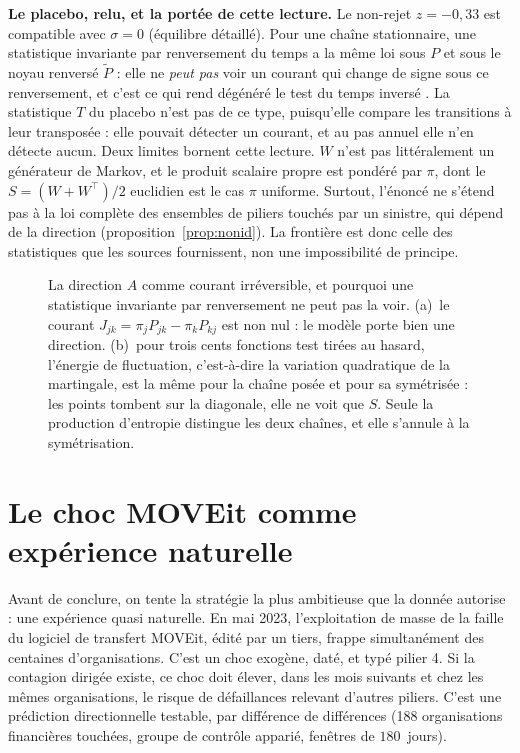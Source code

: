 \begin{cle}
\textbf{Le placebo, relu, et la portée de cette lecture.} Le non-rejet $z=-0{,}33$ est
compatible avec $\sigma=0$ (équilibre détaillé). Pour une chaîne stationnaire, une statistique
invariante par renversement du temps a la même loi sous $P$ et sous le noyau renversé $\tilde P$ :
elle ne \emph{peut pas} voir un courant qui change de signe sous ce renversement, et c'est ce qui
rend dégénéré le test du \og temps inversé \fg{}. La statistique $T$ du placebo n'est pas de ce
type, puisqu'elle compare les transitions à leur transposée : elle pouvait détecter un courant, et
au pas annuel elle n'en détecte aucun. Deux limites bornent cette lecture. $W$ n'est pas
littéralement un générateur de Markov, et le produit scalaire propre est pondéré par $\pi$, dont le
$S=(W+W^\top)/2$ euclidien est le cas $\pi$ uniforme. Surtout, l'énoncé ne s'étend pas à la loi
complète des ensembles de piliers touchés par un sinistre, qui dépend de la direction
(proposition~\ref{prop:nonid}). La frontière est donc celle des statistiques que les sources
fournissent, non une impossibilité de principe.
\end{cle}

\begin{figure}[htbp]
  \centering
  \caption{La direction $A$ comme courant irréversible, et
pourquoi une statistique invariante par renversement ne peut pas la voir. (a)~le courant $J_{jk}=\pi_jP_{jk}-\pi_kP_{kj}$
est non nul : le modèle porte bien une direction. (b)~pour trois cents fonctions test tirées au
hasard, l'énergie de fluctuation, c'est-à-dire la variation quadratique de la martingale, est la
même pour la chaîne posée et pour sa symétrisée : les points tombent sur la diagonale, elle ne voit
que $S$. Seule la production d'entropie distingue les deux chaînes, et elle s'annule à la
symétrisation.}
  \label{fig:reversibilite}
\end{figure}

\section{Le choc MOVEit comme expérience naturelle}

Avant de conclure, on tente la stratégie la plus ambitieuse que la donnée autorise : une
expérience quasi naturelle. En mai 2023, l'exploitation de masse de la faille du logiciel de
transfert MOVEit, édité par un tiers, frappe simultanément des centaines
d'organisations. C'est un choc exogène, daté, et typé pilier 4. Si la
contagion dirigée existe, ce choc doit élever, dans les mois suivants et chez les mêmes
organisations, le risque de défaillances relevant d'autres piliers. C'est une prédiction
directionnelle testable, par différence de différences (188 organisations financières touchées,
groupe de contrôle apparié, fenêtres de $180$~jours).

